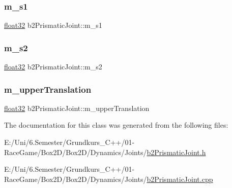 \mbox{\label{classb2_prismatic_joint_a5dad08589b72d49c05b61bbee0a1fa39}} 
\subsubsection{\texorpdfstring{m\_s1}{m\_s1}}
{\footnotesize\ttfamily \mbox{\hyperlink{b2_settings_8h_aacdc525d6f7bddb3ae95d5c311bd06a1}{float32}} b2\+Prismatic\+Joint\+::m\+\_\+s1\hspace{0.3cm}{\ttfamily [protected]}}

\mbox{\label{classb2_prismatic_joint_a7b82750572655292a3e08490d1131f31}} 
\subsubsection{\texorpdfstring{m\_s2}{m\_s2}}
{\footnotesize\ttfamily \mbox{\hyperlink{b2_settings_8h_aacdc525d6f7bddb3ae95d5c311bd06a1}{float32}} b2\+Prismatic\+Joint\+::m\+\_\+s2\hspace{0.3cm}{\ttfamily [protected]}}

\mbox{\label{classb2_prismatic_joint_a09a5bbe1ae720f1f4e2b1fd16f8ad613}} 
\subsubsection{\texorpdfstring{m\_upperTranslation}{m\_upperTranslation}}
{\footnotesize\ttfamily \mbox{\hyperlink{b2_settings_8h_aacdc525d6f7bddb3ae95d5c311bd06a1}{float32}} b2\+Prismatic\+Joint\+::m\+\_\+upper\+Translation\hspace{0.3cm}{\ttfamily [protected]}}



The documentation for this class was generated from the following files\+:\begin{DoxyCompactItemize}
\item 
E\+:/\+Uni/6.\+Semester/\+Grundkurs\+\_\+\+C++/01-\/\+Race\+Game/\+Box2\+D/\+Box2\+D/\+Dynamics/\+Joints/\mbox{\hyperlink{b2_prismatic_joint_8h}{b2\+Prismatic\+Joint.\+h}}\item 
E\+:/\+Uni/6.\+Semester/\+Grundkurs\+\_\+\+C++/01-\/\+Race\+Game/\+Box2\+D/\+Box2\+D/\+Dynamics/\+Joints/\mbox{\hyperlink{b2_prismatic_joint_8cpp}{b2\+Prismatic\+Joint.\+cpp}}\end{DoxyCompactItemize}
